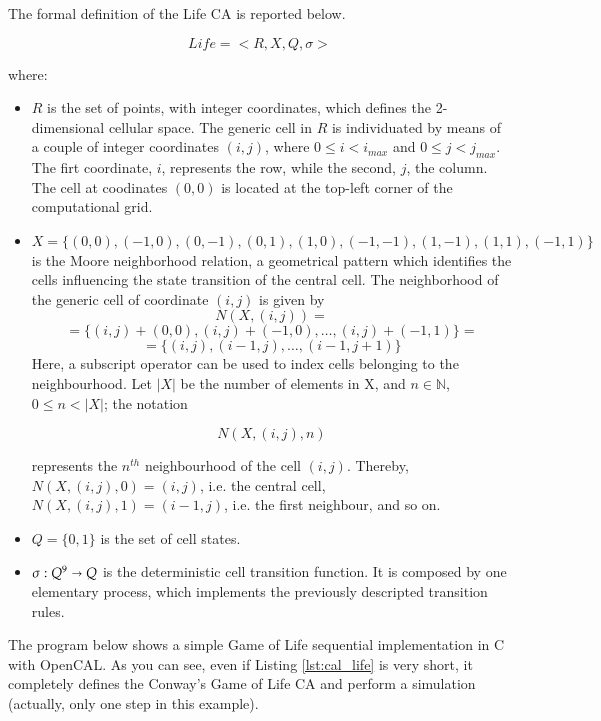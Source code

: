 The formal definition of the Life CA is reported below.

$$Life = < R, X, Q, \sigma >$$

where:

\begin{itemize}

\item $R$ is the set of points, with integer coordinates, which
  defines the 2-dimensional cellular space. The generic cell in $R$ is
  individuated by means of a couple of integer coordinates $(i, j)$,
  where $0 \leq i < i_{max}$ and $0 \leq j < j_{max}$. The firt
  coordinate, $i$, represents the row, while the second, $j$, the
  column. The cell at coodinates $(0,0)$ is located at the top-left
  corner of the computational grid.

\item $X = \{(0,0), (-1, 0), (0, -1), (0, 1), (1, 0), (-1,-1), (1,-1),
  (1,1), (-1,1)\}$ is the Moore neighborhood relation, a geometrical
  pattern which identifies the cells influencing the state transition
  of the central cell. The neighborhood of the generic cell of
  coordinate $(i, j)$ is given by
  $$N(X, (i, j)) = $$
  $$= \{(i, j)+(0,0), (i, j)+(-1, 0), \dots, (i, j)+(-1,1)\} =$$
  $$= \{(i, j), (i-1, j), \dots, (i-1,j+1)\}$$
  Here, a subscript operator can be used to index cells belonging to the
  neighbourhood. Let $|X|$ be the number of elements in X, and $n \in
  \mathbb{N}$, $0 \leq n < |X|$; the notation

  $$N(X, (i, j), n)$$

  represents the $n^{th}$ neighbourhood of the cell $(i,j)$. Thereby,
  $N(X, (i, j), 0) = (i, j)$, i.e. the central cell, $N(X, (i, j), 1)
  = (i-1, j)$, i.e. the first neighbour, and so on.
  
\item $Q = \{0, 1\}$ is the set of cell states.
  
\item $\sigma : Q^9 \shortrightarrow Q$ is the deterministic cell
  transition function. It is composed by one elementary process, which
  implements the previously descripted transition rules.
\end{itemize}


The program below shows a simple Game of Life sequential
implementation in C with OpenCAL. As you can see, even if Listing
\ref{lst:cal_life} is very short, it completely defines the Conway's
Game of Life CA and perform a simulation (actually, only one step in
this example).

